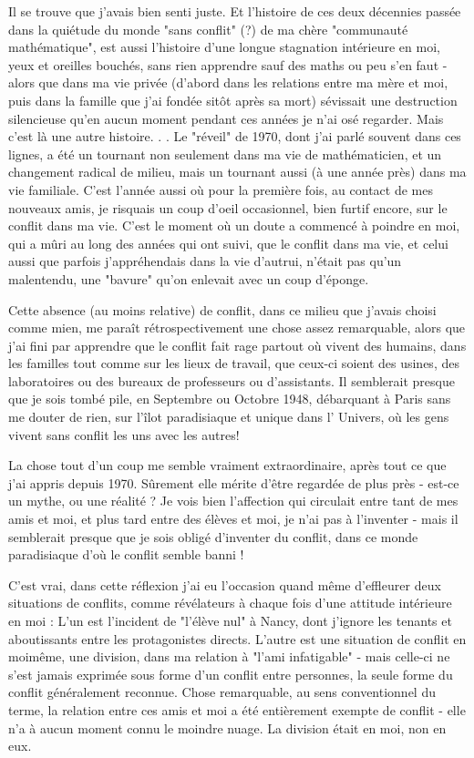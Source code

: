 Il se trouve que j'avais bien senti juste. Et l'histoire de ces deux décennies passée dans la quiétude du monde "sans conflit" (?) de ma chère "communauté mathématique", est aussi l'histoire d'une longue stagnation intérieure en moi, yeux et oreilles bouchés, sans rien apprendre sauf des maths ou peu s'en faut - alors que dans ma vie privée (d'abord dans les relations entre ma mère et moi, puis dans la famille que j'ai fondée sitôt après sa mort) sévissait une destruction silencieuse qu'en aucun moment pendant ces années je n'ai osé regarder. Mais c'est là une autre histoire. . . Le "réveil" de 1970, dont j'ai parlé souvent dans ces lignes, a été un tournant non seulement dans ma vie de mathématicien, et un changement radical de milieu, mais un tournant aussi (à une année près) dans ma vie familiale. C'est l'année aussi où pour la première fois, au contact de mes nouveaux amis, je risquais un coup d'oeil occasionnel, bien furtif encore, sur le conflit dans ma vie. C'est le moment où un doute a commencé à poindre en moi, qui a mûri au long des années qui ont suivi, que le conflit dans ma vie, et celui aussi que parfois j'appréhendais dans la vie d'autrui, n'était pas qu'un malentendu, une "bavure" qu'on enlevait avec un coup d'éponge.

Cette absence (au moins relative) de conflit, dans ce milieu que j'avais choisi comme mien, me paraît rétrospectivement une chose assez remarquable, alors que j'ai fini par apprendre que le conflit fait rage partout où vivent des humains, dans les familles tout comme sur les lieux de travail, que ceux-ci soient des usines, des laboratoires ou des bureaux de professeurs ou d'assistants. Il semblerait presque que je sois tombé pile, en Septembre ou Octobre 1948, débarquant à Paris sans me douter de rien, sur l'îlot paradisiaque et unique dans l' Univers, où les gens vivent sans conflit les uns avec les autres!

La chose tout d'un coup me semble vraiment extraordinaire, après tout ce que j'ai appris depuis 1970. Sûrement elle mérite d'être regardée de plus près - est-ce un mythe, ou une réalité ? Je vois bien l'affection qui circulait entre tant de mes amis et moi, et plus tard entre des élèves et moi, je n'ai pas à l'inventer - mais il semblerait presque que je sois obligé d'inventer du conflit, dans ce monde paradisiaque d'où le conflit semble banni !

C'est vrai, dans cette réflexion j'ai eu l'occasion quand même d'effleurer deux situations de conflits, comme révélateurs à chaque fois d'une attitude intérieure en moi : L'un est l'incident de "l'élève nul" à Nancy, dont j'ignore les tenants et aboutissants entre les protagonistes directs. L'autre est une situation de conflit en moimême, une division, dans ma relation à "l'ami infatigable" - mais celle-ci ne s'est jamais exprimée sous forme d'un conflit entre personnes, la seule forme du conflit généralement reconnue. Chose remarquable, au sens conventionnel du terme, la relation entre ces amis et moi a été entièrement exempte de conflit - elle n'a à aucun moment connu le moindre nuage. La division était en moi, non en eux.

